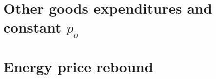 \documentclass[12pt]{article}\usepackage[]{graphicx}\usepackage[]{xcolor}
\begin{document}
\section{Other goods expenditures and constant $p_o$}
\label{sec:other_goods_expenditures}







\section{Energy price rebound}
\label{sec:price_effect_appendix}


\end{document}
